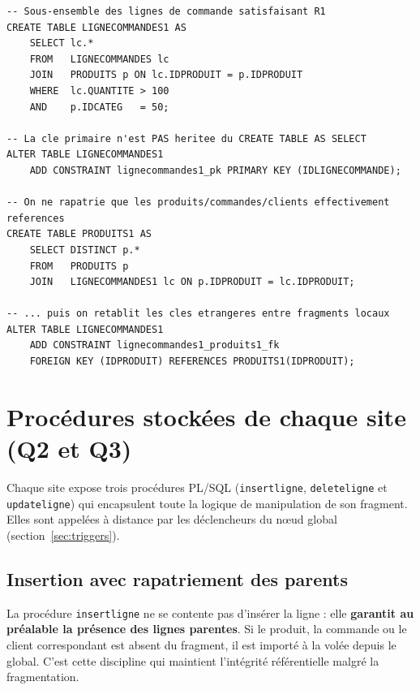 \documentclass[11pt,a4paper]{article}
\begin{document}
\begin{lstlisting}[style=sql,caption={Construction du fragment R1 sur le site~1 (extrait de \texttt{03\_create\_tables.sql}).},label={lst:fragment}]
-- Sous-ensemble des lignes de commande satisfaisant R1
CREATE TABLE LIGNECOMMANDES1 AS
    SELECT lc.*
    FROM   LIGNECOMMANDES lc
    JOIN   PRODUITS p ON lc.IDPRODUIT = p.IDPRODUIT
    WHERE  lc.QUANTITE > 100
    AND    p.IDCATEG   = 50;

-- La cle primaire n'est PAS heritee du CREATE TABLE AS SELECT
ALTER TABLE LIGNECOMMANDES1
    ADD CONSTRAINT lignecommandes1_pk PRIMARY KEY (IDLIGNECOMMANDE);

-- On ne rapatrie que les produits/commandes/clients effectivement references
CREATE TABLE PRODUITS1 AS
    SELECT DISTINCT p.*
    FROM   PRODUITS p
    JOIN   LIGNECOMMANDES1 lc ON p.IDPRODUIT = lc.IDPRODUIT;

-- ... puis on retablit les cles etrangeres entre fragments locaux
ALTER TABLE LIGNECOMMANDES1
    ADD CONSTRAINT lignecommandes1_produits1_fk
    FOREIGN KEY (IDPRODUIT) REFERENCES PRODUITS1(IDPRODUIT);
\end{lstlisting}

\section{Procédures stockées de chaque site (Q2 et Q3)}

Chaque site expose trois procédures PL/SQL (\texttt{insertligne},
\texttt{deleteligne} et \texttt{updateligne}) qui encapsulent toute la
logique de manipulation de son fragment. Elles sont appelées à distance par les
déclencheurs du nœud global (section~\ref{sec:triggers}).

\subsection{Insertion avec rapatriement des parents}

La procédure \texttt{insertligne} ne se contente pas d'insérer la ligne : elle
\textbf{garantit au préalable la présence des lignes parentes}. Si le produit,
la commande ou le client correspondant est absent du fragment, il est importé à
la volée depuis le global. C'est cette discipline qui maintient l'intégrité
référentielle malgré la fragmentation.
\end{document}
